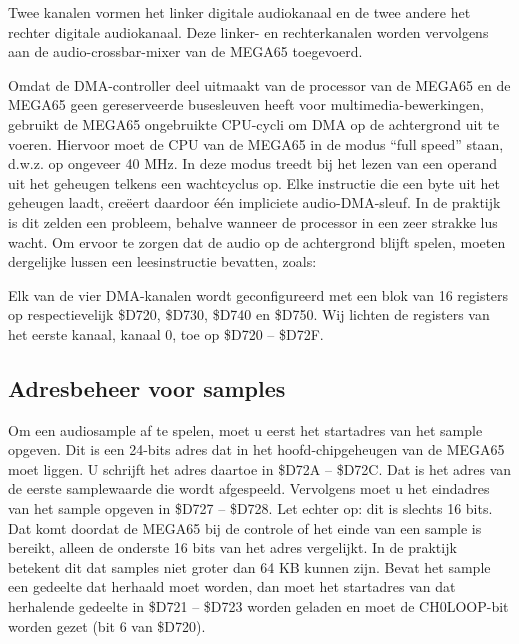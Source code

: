 Twee kanalen vormen het linker digitale audiokanaal en de twee andere het rechter digitale audiokanaal. Deze linker- en rechterkanalen worden vervolgens aan de audio-crossbar-mixer van de MEGA65 toegevoerd.

Omdat de DMA-controller deel uitmaakt van de processor van de MEGA65 en de MEGA65 geen gereserveerde busesleuven heeft voor multimedia-bewerkingen, gebruikt de MEGA65 ongebruikte CPU-cycli om DMA op de achtergrond uit te voeren. Hiervoor moet de CPU van de MEGA65 in de modus ``full speed'' staan, d.w.z. op ongeveer 40 MHz. In deze modus treedt bij het lezen van een operand uit het geheugen telkens een wachtcyclus op. Elke instructie die een byte uit het geheugen laadt, creëert daardoor één impliciete audio-DMA-sleuf. In de praktijk is dit zelden een probleem, behalve wanneer de processor in een zeer strakke lus wacht. Om ervoor te zorgen dat de audio op de achtergrond blijft spelen, moeten dergelijke lussen een leesinstructie bevatten, zoals:


Elk van de vier DMA-kanalen wordt geconfigureerd met een blok van 16 registers op respectievelijk \$D720, \$D730, \$D740 en \$D750. Wij lichten de registers van het eerste kanaal, kanaal 0, toe op \$D720 -- \$D72F.

\subsection{Adresbeheer voor samples}

Om een audiosample af te spelen, moet u eerst het startadres van het sample opgeven. Dit is een 24-bits adres dat in het hoofd-chipgeheugen van de MEGA65 moet liggen. U schrijft het adres daartoe in \$D72A -- \$D72C. Dat is het adres van de eerste samplewaarde die wordt afgespeeld. Vervolgens moet u het eindadres van het sample opgeven in \$D727 -- \$D728. Let echter op: dit is slechts 16 bits. Dat komt doordat de MEGA65 bij de controle of het einde van een sample is bereikt, alleen de onderste 16 bits van het adres vergelijkt. In de praktijk betekent dit dat samples niet groter dan 64 KB kunnen zijn. Bevat het sample een gedeelte dat herhaald moet worden, dan moet het startadres van dat herhalende gedeelte in \$D721 -- \$D723 worden geladen en moet de CH0LOOP-bit worden gezet (bit 6 van \$D720).


